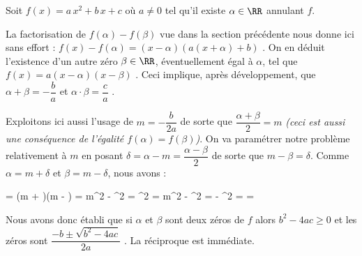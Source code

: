 Soit $f(x) = a \, x^2 + b \, x + c$ où $a \neq 0$ tel qu'il existe $\alpha \in \RR$ annulant $f$.

\medskip

La factorisation de $f(\alpha) - f(\beta)$ vue dans la section précédente nous donne ici sans effort : 
$f(x) - f(\alpha) = (x - \alpha) (a (x + \alpha) + b)$ .
On en déduit l'existence d'un autre zéro $\beta \in \RR$, éventuellement égal à $\alpha$, tel que
$f(x) = a (x - \alpha) (x - \beta)$ .
Ceci implique, après développement, que
$\alpha   +   \beta = - \dfrac{b}{a}$
et
$\alpha \cdot \beta = \dfrac{c}{a}$ .


\medskip

Exploitons ici aussi l'usage de $m = - \dfrac{b}{2a}$ de sorte que
$\dfrac{\alpha + \beta}{2} = m$
\emph{(ceci est aussi une conséquence de l'égalité $f(\alpha) = f(\beta)$)}.
On va paramétrer notre problème relativement à $m$ en posant
$\delta = \alpha - m = \dfrac{\alpha - \beta}{2}$ de sorte que
$m - \beta = \delta$.
Comme $\alpha = m + \delta$ et $\beta = m - \delta$, nous avons :

\medskip

\begin{explain}[style = sar, ope = \iff]
	\alpha \cdot \beta = 
		\explnext{}
	(m + \delta)(m - \delta) = 
		\explnext{}
	m^2 - \delta^2 = 
		\explnext{}
	\delta^2 = m^2 - 
		\explnext{}
	\delta^2 =  - 
		\explnext{}
	\delta^2 = 
	\delta = \pm {}
\end{explain}

\medskip

Nous avons donc établi que si $\alpha$ et $\beta$ sont deux zéros de $f$ alors $b^2 - 4 ac \geq 0$ et les zéros sont $\dfrac{-b \pm \sqrt{b^2 - 4 ac}}{2 a}$ .
La réciproque est immédiate.
